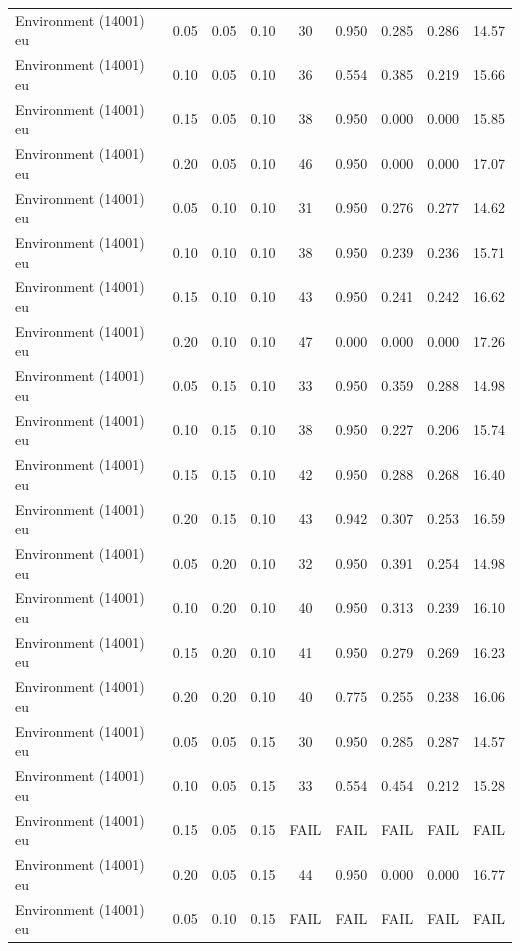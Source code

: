 \begin{longtable}[t]{lrrrccccc}
\addlinespace
Environment (14001) eu & 0.05 & 0.05 & 0.10 & 30 & 0.950 & 0.285 & 0.286 & 14.57\\
Environment (14001) eu & 0.10 & 0.05 & 0.10 & 36 & 0.554 & 0.385 & 0.219 & 15.66\\
Environment (14001) eu & 0.15 & 0.05 & 0.10 & 38 & 0.950 & 0.000 & 0.000 & 15.85\\
Environment (14001) eu & 0.20 & 0.05 & 0.10 & 46 & 0.950 & 0.000 & 0.000 & 17.07\\
Environment (14001) eu & 0.05 & 0.10 & 0.10 & 31 & 0.950 & 0.276 & 0.277 & 14.62\\
\addlinespace
Environment (14001) eu & 0.10 & 0.10 & 0.10 & 38 & 0.950 & 0.239 & 0.236 & 15.71\\
Environment (14001) eu & 0.15 & 0.10 & 0.10 & 43 & 0.950 & 0.241 & 0.242 & 16.62\\
Environment (14001) eu & 0.20 & 0.10 & 0.10 & 47 & 0.000 & 0.000 & 0.000 & 17.26\\
Environment (14001) eu & 0.05 & 0.15 & 0.10 & 33 & 0.950 & 0.359 & 0.288 & 14.98\\
Environment (14001) eu & 0.10 & 0.15 & 0.10 & 38 & 0.950 & 0.227 & 0.206 & 15.74\\
\addlinespace
Environment (14001) eu & 0.15 & 0.15 & 0.10 & 42 & 0.950 & 0.288 & 0.268 & 16.40\\
Environment (14001) eu & 0.20 & 0.15 & 0.10 & 43 & 0.942 & 0.307 & 0.253 & 16.59\\
Environment (14001) eu & 0.05 & 0.20 & 0.10 & 32 & 0.950 & 0.391 & 0.254 & 14.98\\
Environment (14001) eu & 0.10 & 0.20 & 0.10 & 40 & 0.950 & 0.313 & 0.239 & 16.10\\
Environment (14001) eu & 0.15 & 0.20 & 0.10 & 41 & 0.950 & 0.279 & 0.269 & 16.23\\
\addlinespace
Environment (14001) eu & 0.20 & 0.20 & 0.10 & 40 & 0.775 & 0.255 & 0.238 & 16.06\\
Environment (14001) eu & 0.05 & 0.05 & 0.15 & 30 & 0.950 & 0.285 & 0.287 & 14.57\\
Environment (14001) eu & 0.10 & 0.05 & 0.15 & 33 & 0.554 & 0.454 & 0.212 & 15.28\\
Environment (14001) eu & 0.15 & 0.05 & 0.15 & FAIL & FAIL & FAIL & FAIL & FAIL\\
Environment (14001) eu & 0.20 & 0.05 & 0.15 & 44 & 0.950 & 0.000 & 0.000 & 16.77\\
\addlinespace
Environment (14001) eu & 0.05 & 0.10 & 0.15 & FAIL & FAIL & FAIL & FAIL & FAIL\\

\end{longtable}
